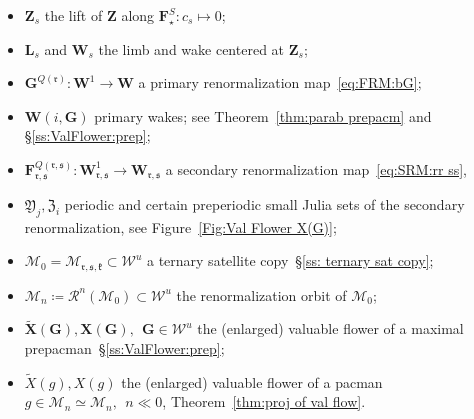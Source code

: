 \documentclass{amsart}
\renewcommand{\sp}{{\ \ }}
\newcommand{\1}{{\mathbb 1 }}
\newcommand\MM{\mathscr{M}}
\newcommand\bMM{{\pmb {\MM}}}
\newcommand\RR{\mathcal{R}}
\newcommand\frakY{{\mathfrak Y}}
\newcommand\frakZ{{\mathfrak Z}}
\newcommand{\bF}{{\mathbf F}}
\newcommand{\bZ}{{\mathbf Z}}
\newcommand{\bL}{{\mathbf L}}
\newcommand{\bX}{{\mathbf X}}
\newcommand{\bW}{{\mathbf W}}
\newcommand{\bG}{{\mathbf G}}
\newcommand{\str}{{\star}}
\newcommand{\rr}{\mathfrak{r}}
\renewcommand{\ss}{\mathfrak{s}}
\newcommand{\kk}{\mathfrak{k}}
\newcommand\Unst{{\boldsymbol{\mathcal{W}}^u}}
\theoremstyle{remark}
\numberwithin{equation}{section}
\theoremstyle{definition}
\theoremstyle{nonumberbreak}
\begin{document}
\begin{itemize}
\item $\bZ_s$ the lift of $\bZ$ along $\bF_\str^S\colon c_s \mapsto 0$;
\item  $\bL_s$ and $\bW_s$ the limb and wake centered at $\bZ_s$;


\item $\bG^{Q(\rr)}\colon \bW^1\to \bW$ a primary renormalization map~\eqref{eq:FRM:bG};
\item $\bW(i,\bG)$ primary wakes; see Theorem~\ref{thm:parab prepacm} and \S\ref{ss:ValFlower:prep};
\item $\bF^{Q(\rr,\ss)}_{\rr,\ss}\colon \bW_{\rr,\ss}^1 \to \bW_{\rr,\ss}$ a secondary renormalization map~\eqref{eq:SRM:rr ss}, 
\item $\frakY_j, \frakZ_i$ periodic and certain preperiodic small Julia sets of the secondary renormalization, see Figure~\ref{Fig:Val Flower X(G)};
\item $\bMM_0=\bMM_{\rr,\ss,\kk}\subset \Unst$ a ternary satellite copy~\S\ref{ss: ternary sat copy}; 
\item $\bMM_{n}\coloneqq \RR^{n}(\bMM_0)\subset \Unst$ the renormalization orbit of $\bMM_0$;
\item $\widetilde \bX(\bG), \bX(\bG), \sp \bG\in \Unst$ the (enlarged) valuable flower of a maximal prepacman~\S\ref{ss:ValFlower:prep};
\item $\widetilde X(g), X(g)$ the (enlarged) valuable flower of a pacman $g\in \MM_n\simeq \bMM_n, \sp {n\ll 0}$, Theorem~\ref{thm:proj of val flow}.
\end{itemize}




\end{document}
